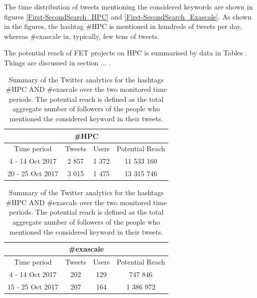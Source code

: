The time distribution of tweets mentioning the considered keywords are shown in figures \ref{First-SecondSearch_HPC} and \ref{First-SecondSearch_Exascale}. As shown in the figures, the hashtag \#HPC is mentioned in hundreds of tweets per day, whereas \#exascale in, typically, few tens of tweets. 

The potential reach of FET projects on HPC is summarised by data in Tables . Things are discussed in section ... .

\begin{table}[t]
 \begin{center}
 
  \begin{tabular}{cccc}
   \hline 
   \hline
   \multicolumn{4}{c}{\#HPC}\\
   \hline
   \hline
   Time period & Tweets & Users & Potential Reach \\ 
   \hline
   4 - 14 Oct 2017 & 2 857 & 1 372 & 11 533 160  \\
   20 - 25 Oct 2017 & 3 015 & 1 475 & 13 315 746  \\
   \hline
   \hline
  \end{tabular}

  \bigskip

  \begin{tabular}{cccc}
   \hline 
   \hline
   \multicolumn{4}{c}{\#exascale}\\
   \hline 
   \hline
   Time period & Tweets & Users & Potential Reach \\ 
   \hline
   4 - 14 Oct 2017 & 202 & 129 & 747 846 \\
   15 - 25 Oct 2017 & 207 & 164 & 1 386 972  \\
   \hline
   \hline
  \end{tabular}
 \end{center} 
 \caption{Summary of the Twitter analytics for the hashtags \#HPC AND \#exascale over the two monitored time periods. The potential reach is defined as the total aggregate number of followers of the people who mentioned the considered keyword in their tweets.}
\label{Summary_HPC-Exascale} 
\end{table}    

